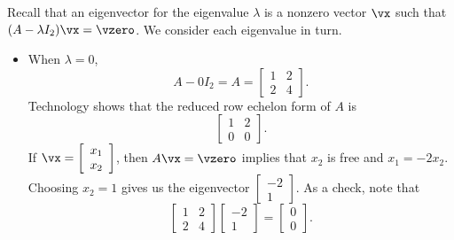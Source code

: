 \begin{example}
\item Recall that an eigenvector for the eigenvalue $\lambda$ is a nonzero vector $\vx$ such that $(A - \lambda I_2) \vx = \vzero$. We consider each eigenvalue in turn. 
\begin{itemize}
\item When $\lambda = 0$, 
\[A - 0 I_2 = A = \left[ \begin{array}{cc} 1&2\\2&4 \end{array} \right].\]
Technology shows that the reduced row echelon form of $A$ is 
\[\left[ \begin{array}{cc} 1&2 \\ 0&0 \end{array} \right].\]
If $\vx = \left[ \begin{array}{c} x_1\\x_2 \end{array} \right]$, then $A \vx = \vzero$ implies that $x_2$ is free and $x_1 = -2x_2$. Choosing $x_2 = 1$ gives us the eigenvector $\left[ \begin{array}{r} -2\\1 \end{array} \right]$. As a check, note that 
\[\left[ \begin{array}{cc} 1&2\\2&4 \end{array} \right] \left[ \begin{array}{r} -2\\1 \end{array} \right] = \left[ \begin{array}{c} 0\\0 \end{array} \right].\]


\end{itemize}
\end{example}
